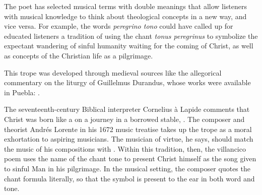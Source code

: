 The poet has selected musical terms with double meanings that allow listeners
with musical knowledge to think about theological concepts in a new way, and
vice versa.
For example, the words \emph{peregrino tono} could have called up for educated
listeners a tradition of using the chant \emph{tonus peregrinus} to symbolize
the expectant wandering of sinful humanity waiting for the coming of Christ, as
well as concepts of the Christian life as a pilgrimage.%
\begin{Footnote}
    This trope was developed through medieval sources like the allegorical
    commentary on the liturgy of Guillelmus Durandus, whose works were available
    in Puebla: \autocite[234]{Wright:Maze}.
\end{Footnote}
The seventeenth-century Biblical interpreter Cornelius à Lapide comments that
Christ was born like a   on a journey in
a borrowed stable, .
    \Autocites
    [884, on :
    .]
    {Lapide:Gospels19C}
    [669, on : 
    .] 
    {Lapide:Gospels19C}
The composer and theorist Andrés Lorente in his 1672 music treatise takes up the
 trope as a moral exhortation to aspiring musicians.
The musician of virtue, he says, should match the music of his compositions with
.%
    \Autocite[609]{Lorente:Porque}
Within this tradition, then, the villancico poem uses the name of the chant tone
to present Christ himself as the song given to sinful Man in his pilgrimage. 
In the musical setting, the composer quotes the chant formula literally, so that
the symbol is present to the ear in both word and tone.

